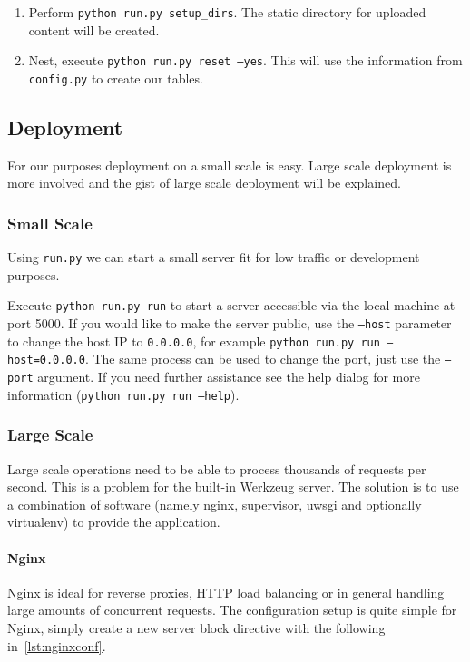 \documentclass[11pt]{article}
\newcommand{\cmd}[1]{\textcolor{code}{\texttt{#1}}}
\begin{document}
				\begin{enumerate}
					\item Perform \cmd{python run.py setup\_dirs}. The static directory for uploaded content will be created.
					\item Nest, execute \cmd{python run.py reset --yes}. This will use the information from \cmd{config.py} to create our tables.
				\end{enumerate}							
			
		\subsection{Deployment}
			For our purposes deployment on a small scale is easy. Large scale deployment is more involved and the gist of large scale deployment will be explained.
			
			\subsubsection{Small Scale}
				Using \cmd{run.py} we can start a small server fit for low traffic or development purposes.
				
				Execute \cmd{python run.py run} to start a server accessible via the local machine at port 5000. If you would like to make the server public, use the \cmd{--host} parameter to change the host IP to \cmd{0.0.0.0}, for example \cmd{python run.py run --host=0.0.0.0}. The same process can be used to change the port, just use the \cmd{--port} argument. If you need further assistance see the help dialog for more information (\cmd{python run.py run --help}).
				
			\subsubsection{Large Scale}
				Large scale operations need to be able to process thousands of requests per second. This is a problem for the built-in Werkzeug server. The solution is to use a combination of software (namely nginx, supervisor, uwsgi and optionally virtualenv) to provide the application.
				
				\paragraph{Nginx}
					Nginx is ideal for reverse proxies, HTTP load balancing or in general handling large amounts of concurrent requests. The configuration setup is quite simple for Nginx, simply create a new server block directive with the following in~\cref{lst:nginxconf}.
					
\end{document}
